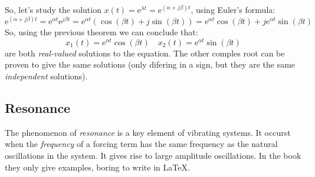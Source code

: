 \documentclass[../ode.tex]{subfiles}
\begin{document}
    So, let's study the solution $x(t)=\mathrm{e}^{\lambda t}=\mathrm{e}^{(\alpha + j\beta) t}$, using Euler's formula:
    \begin{equation*}
        \mathrm{e}^{(\alpha + j\beta) t} = \mathrm{e}^{\alpha t} \mathrm{e}^{j\beta t} = \mathrm{e}^{\alpha t} (\cos(\beta t) + j
        \sin(\beta t)) = \mathrm{e}^{\alpha t }\cos(\beta t) + j \mathrm{e}^{\alpha t} \sin(\beta t)
    \end{equation*}
    So, using the previous theorem we can conclude that:
    \begin{equation*}
        x_1(t) = \mathrm{e}^{\alpha t} \cos(\beta t) \quad x_2(t) = \mathrm{e}^{\alpha t} \sin(\beta t)
    \end{equation*}
    are both \emph{real-valued} solutions to the equation. The other comples root can be proven to give the same solutions (only
    difering in a sign, but they are the same \emph{independent} solutions).
    
    

    \subsection{\sffamily Resonance}
    
    The phenomenon of \emph{resonance} is a key element of vibrating systems. It occurst when the \emph{frequency} of a forcing
    term has the same frequency as the natural oscillations in the system. It gives rise to large amplitude oscillations. In the
    book they only give examples, boring to write in \LaTeX.
\end{document}
